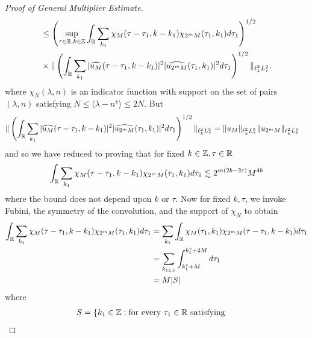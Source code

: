 \begin{proof}[Proof of General Multiplier Estimate]
\begin{equation*}
\begin{split}
& \le \left ( \sup_{\tau \in \mathbb{R}, k \in \mathbb{Z}} \int_{\mathbb{R}} \sum_{k_{1}}
\chi_{M}(\tau - \tau_{1}, k - k_{1}) \chi_{2^{m}M}(\tau_{1}, k_{1}) d \tau_{1} \right )^{1/2}  
\\
& \times \| \left( \int_{\mathbb{R}} \sum_{k_{1}} | \widehat{u_{M}}(\tau - \tau_{1}, k - k_{1}) |^{2} | \widehat{u_{2^{m}M}}(\tau_{1}, k_{1}) |^{2} d \tau_{1} \right)^{1/2} \|_{\ell^{2}_{k} L^{2}_{\tau}}. 
\end{split}
\end{equation*}
%
%
where $\chi_{N}(\lambda, n)$ is an indicator function with support on the set of pairs $(\lambda, n)$ satisfying $N \le \langle \lambda - n^{v} \rangle  \le 2N$.  But
%
%
\begin{equation*}
\begin{split}
  \| \left( \int_{\mathbb{R}} \sum_{k_{1}} | \widehat{u_{M}}(\tau - \tau_{1}, k - k_{1}) |^{2} | \widehat{u_{2^{m}M}}(\tau_{1}, k_{1}) |^{2} d \tau_{1} \right)^{1/2} \|_{\ell^{2}_{k}L^{2}_{\tau}} 
  & = \| u_{M} \|_{\ell^{2}_{k}L^{2}_{\tau}} \| u_{2^{m} M} \|_{\ell^{2}_{k}L^{2}_{\tau}} 
\end{split}
\end{equation*}
%
%
and so we have reduced to proving that for fixed $k \in \mathbb{Z}, \tau \in \mathbb{R}$
%
%
\begin{equation*}
\begin{split}
\int_{\mathbb{R}} \sum_{k_{1}}
\chi_{M}(\tau - \tau_{1}, k - k_{1}) \chi_{2^{m}M}(\tau_{1}, k_{1}) d \tau_{1}  \lesssim 2^{m(2b - 2 \varepsilon)} M^{4b}
\end{split}
\end{equation*}
%
%
where the bound does not depend upon $k$ or $\tau$. Now for fixed $k, \tau$, we invoke Fubini, the symmetry of the convolution, and the support of $\chi_{N}$ to obtain
%
%
\begin{equation*}
\begin{split}
\int_{\mathbb{R}} \sum_{k_{1}}
\chi_{M}(\tau - \tau_{1}, k - k_{1}) \chi_{2^{m}M}(\tau_{1}, k_{1}) d \tau_{1}  
& = 
\sum_{k_{1}}\int_{\mathbb{R}} 
\chi_{M}(\tau_{1}, k_{1}) \chi_{2^{m}M}(\tau - \tau_{1}, k - k_{1}) d \tau_{1} 
\\
& = \sum_{k_{1 \in S}} \int_{k_{1}^{v} + M}^{k_{1}^{v} + 2M} d \tau_{1}
\\
& = M | S |
\end{split}
\end{equation*}
%
%
where
%
%
\begin{equation*}
\begin{split}
  S =  \{ & k_{1} \in \zz: \text{for every} \ \tau_{1} \in \rr \ \text{satisfying} \ 

\end{split}
\end{equation*}
\end{proof}
